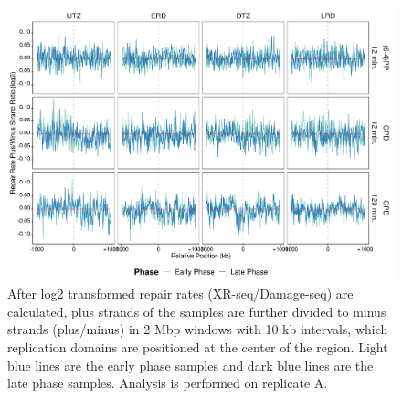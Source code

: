 \begin{figure}[H]
\begin{center}
\includegraphics[width=\textwidth]{Chapters/7_appendix/figures/supfig34}
\caption[Repair rate plus/minus phase ratio of replication domains in 2 Mbp (replicate A).]{After log2 transformed repair rates (XR-seq/Damage-seq) are calculated, plus strands of the samples are further divided to minus strands (plus/minus) in 2 Mbp windows with 10 kb intervals, which replication domains are positioned at the center of the region. Light blue lines are the early phase samples and dark blue lines are the late phase samples. Analysis is performed on replicate A.}
\label{supfig:rrpm2000repdomainA}
\end{center}
\end{figure}

